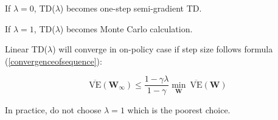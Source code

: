 If $\lambda = 0$, TD($\lambda$) becomes one-step semi-gradient TD. 

If $\lambda = 1$, TD($\lambda$) becomes Monte Carlo calculation.


Linear TD($\lambda$) will converge in on-policy case if step size follows formula (\ref{convergenceofsequence}):


\begin{equation}\label{semigradientlrerror}
	\overline{\text{VE}}(\mathbf{W}_{\infty}) \leq \frac{1 - \gamma \lambda}{1-\gamma} \underset{\mathbf{W}}{\min}\ \overline{\text{VE}}(\mathbf{W})
\end{equation}

In practice, do not choose $\lambda = 1$ which is the poorest choice.











